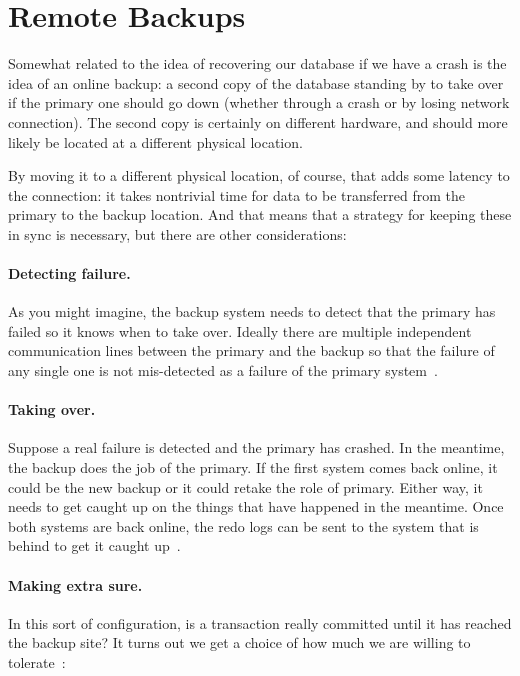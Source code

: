\section*{Remote Backups}

Somewhat related to the idea of recovering our database if we have a crash is the idea of an online backup: a second copy of the database standing by to take over if the primary one should go down (whether through a crash or by losing network connection). The second copy is certainly on different hardware, and should more likely be located at a different physical location. 

By moving it to a different physical location, of course, that adds some latency to the connection: it takes nontrivial time for data to be transferred from the primary to the backup location. And that means that a strategy for keeping these in sync is necessary, but there are other considerations:

\paragraph{Detecting failure.} As you might imagine, the backup system needs to detect that the primary has failed so it knows when to take over. Ideally there are multiple independent communication lines between the primary and the backup so that the failure of any single one is not mis-detected as a failure of the primary system~\cite{dsc}.

\paragraph{Taking over.} Suppose a real failure is detected and the primary has crashed. In the meantime, the backup does the job of the primary. If the first system comes back online, it could be the new backup or it could retake the role of primary. Either way, it needs to get caught up on the things that have happened in the meantime. Once both systems are back online, the redo logs can be sent to the system that is behind to get it caught up~\cite{dsc}.

\paragraph{Making extra sure.} In this sort of configuration, is a transaction really committed until it has reached the backup site? It turns out we get a choice of how much we are willing to tolerate~\cite{dsc}:

